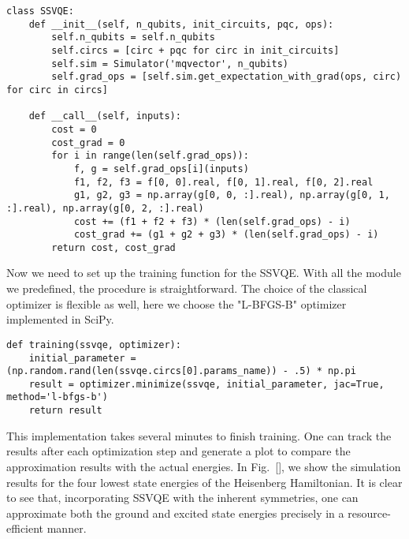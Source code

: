 \begin{lstlisting}
class SSVQE:
    def __init__(self, n_qubits, init_circuits, pqc, ops):
        self.n_qubits = self.n_qubits
        self.circs = [circ + pqc for circ in init_circuits]
        self.sim = Simulator('mqvector', n_qubits)
        self.grad_ops = [self.sim.get_expectation_with_grad(ops, circ) for circ in circs]
    
    def __call__(self, inputs):
        cost = 0
        cost_grad = 0
        for i in range(len(self.grad_ops)):
            f, g = self.grad_ops[i](inputs)
            f1, f2, f3 = f[0, 0].real, f[0, 1].real, f[0, 2].real
            g1, g2, g3 = np.array(g[0, 0, :].real), np.array(g[0, 1, :].real), np.array(g[0, 2, :].real)
            cost += (f1 + f2 + f3) * (len(self.grad_ops) - i)
            cost_grad += (g1 + g2 + g3) * (len(self.grad_ops) - i)
        return cost, cost_grad
\end{lstlisting}

Now we need to set up the training function for the SSVQE. With all the module we predefined, the procedure is straightforward. The choice of the classical optimizer is flexible as well, here we choose the "L-BFGS-B" optimizer implemented in SciPy.

\begin{lstlisting}
def training(ssvqe, optimizer):
    initial_parameter = (np.random.rand(len(ssvqe.circs[0].params_name)) - .5) * np.pi
    result = optimizer.minimize(ssvqe, initial_parameter, jac=True, method='l-bfgs-b')
    return result
\end{lstlisting}

This implementation takes several minutes to finish training. One can track the results after each optimization step and generate a plot to compare the approximation results with the actual energies. In Fig.~\ref{}, we show the simulation results for the four lowest state energies of the Heisenberg Hamiltonian. It is clear to see that, incorporating SSVQE with the inherent symmetries, one can approximate both the ground and excited state energies precisely in a resource-efficient manner.